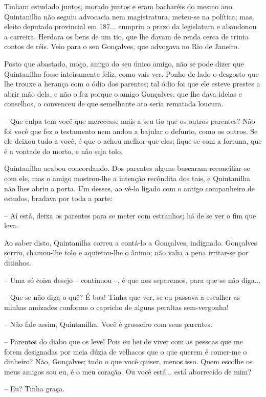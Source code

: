 Tinham estudado juntos, morado juntos e eram bacharéis do mesmo ano.
Quintanilha não seguiu advocacia nem magistratura, meteu-se na política;
mas, eleito deputado provincial em 187... cumpriu o prazo da legislatura
e abandonou a carreira. Herdara os bens de um tio, que lhe davam de
renda cerca de trinta contos de réis. Veio para o seu Gonçalves, que
advogava no Rio de Janeiro.

Posto que abastado, moço, amigo do seu único amigo, não se pode dizer
que Quintanilha fosse inteiramente feliz, como vais ver. Ponho de lado o
desgosto que lhe trouxe a herança com o ódio dos parentes; tal ódio foi
que ele esteve prestes a abrir mão dela, e não o fez porque o amigo
Gonçalves, que lhe dava ideias e conselhos, o convenceu de que
semelhante ato seria rematada loucura.

-- Que culpa tem você que merecesse mais a seu tio que os outros
parentes? Não foi você que fez o testamento nem andou a bajular o
defunto, como os outros. Se ele deixou tudo a você, é que o achou melhor
que eles; fique-se com a fortuna, que é a vontade do morto, e não seja
tolo.

Quintanilha acabou concordando. Dos parentes alguns buscaram
reconciliar-se com ele, mas o amigo mostrou-lhe a intenção recôndita dos
tais, e Quintanilha não lhes abriu a porta. Um desses, ao vê-lo ligado
com o antigo companheiro de estudos, bradava por toda a parte:

-- Aí está, deixa os parentes para se meter com estranhos; há de se ver
o fim que leva.

Ao saber disto, Quintanilha correu a contá-lo a Gonçalves, indignado.
Gonçalves sorriu, chamou-lhe tolo e aquietou-lhe o ânimo; não valia a
pena irritar-se por ditinhos.

-- Uma só coisa desejo -- continuou --, é que nos separemos, para que se
não diga...

-- Que se não diga o quê? É boa! Tinha que ver, se eu passava a escolher
as minhas amizades conforme o capricho de alguns peraltas sem-vergonha!

-- Não fale assim, Quintanilha. Você é grosseiro com seus parentes.

-- Parentes do diabo que os leve! Pois eu hei de viver com as pessoas
que me forem designadas por meia dúzia de velhacos que o que querem é
comer-me o dinheiro? Não, Gonçalves; tudo o que você quiser, menos isso.
Quem escolhe os meus amigos sou eu, é o meu coração. Ou você está...
está aborrecido de mim?

-- Eu? Tinha graça.

